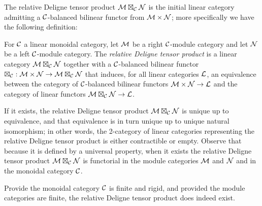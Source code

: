 \documentclass{amsart}
\begin{document}
The relative Deligne tensor product $\mathcal M \boxtimes_\mathcal C \mathcal N$ is the initial linear category admitting a $\mathcal C$-balanced bilinear functor from $\mathcal M \times \mathcal N$; more specifically we have the following definition:

\begin{definition}
	For $\mathcal C$ a linear monoidal category, let $\mathcal M$ be a right $\mathcal C$-module category and let $\mathcal N$ be a left $\mathcal C$-module category.  The {\em relative Deligne tensor product} is a linear category $\mathcal M \boxtimes_{\mathcal C} \mathcal N$ together with a $\mathcal C$-balanced bilinear functor $\boxtimes_{\mathcal C}: \mathcal M \times \mathcal N \to \mathcal M \boxtimes_{\mathcal C} \mathcal N$ that induces, for all linear categories $\mathcal L$, an equivalence between the category of $\mathcal C$-balanced bilinear functors $\mathcal M \times \mathcal N \to \mathcal L$ and the category of linear functors $\mathcal M \boxtimes_{\mathcal C} \mathcal N \to \mathcal L$. 
\end{definition}

\nid If it exists, the relative Deligne tensor product $\mathcal M \boxtimes_\mathcal C \mathcal N$ is unique up to equivalence, and that equivalence is in turn unique up to unique natural isomorphism; in other words, the 2-category of linear categories representing the relative Deligne tensor product is either contractible or empty.  Observe that because it is defined by a universal property, when it exists the relative Deligne tensor product $\mathcal M \boxtimes_\mathcal C \mathcal N$ is functorial in the module categories $\mathcal M$ and $\mathcal N$ and in the monoidal category $\mathcal C$. %

Provide the monoidal category $\mathcal C$ is finite and rigid, and provided the module categories are finite, the relative Deligne tensor product does indeed exist.
\end{document}
